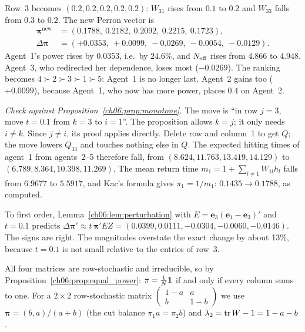 \documentclass[../solutions_manual.tex]{subfiles}
\begin{document}
 Row~3 becomes $(0.2, 0.2, 0.2, 0.2, 0.2)$: $W_{31}$ rises from $0.1$ to $0.2$ and $W_{33}$ falls from $0.3$ to $0.2$. The new Perron vector is
\begin{align*}
\boldsymbol{\pi}^{\text{new}} &= (0.1788,\ 0.2182,\ 0.2092,\ 0.2215,\ 0.1723),\\
\Delta\boldsymbol{\pi} &= (+0.0353,\ +0.0099,\ -0.0269,\ -0.0054,\ -0.0129).
\end{align*}
Agent~1's power rises by $0.0353$, i.e.\ by $24.6\%$, and $N_{\text{eff}}$ rises from $4.866$ to $4.948$. Agent~3, who redirected her dependence, loses most ($-0.0269$). The ranking becomes $4 \succ 2 \succ 3 \succ 1 \succ 5$: Agent~1 is no longer last. Agent~2 gains too ($+0.0099$), because Agent~1, who now has more power, places $0.4$ on Agent~2.

\emph{Check against Proposition~\ref{ch06:prop:monotone}.} The move is ``in row $j = 3$, move $t = 0.1$ from $k = 3$ to $i = 1$''. The proposition allows $k = j$; it only needs $i \ne k$. Since $j \ne i$, its proof applies directly. Delete row and column~1 to get $Q$; the move lowers $Q_{33}$ and touches nothing else in $Q$. The expected hitting times of agent~1 from agents~2--5 therefore fall, from $(8.624, 11.763, 13.419, 14.129)$ to $(6.789, 8.364, 10.398, 11.269)$. The mean return time $m_1 = 1 + \sum_{l\neq 1}W_{1l}h_l$ falls from $6.9677$ to $5.5917$, and Kac's formula gives $\pi_1 = 1/m_1$: $0.1435 \to 0.1788$, as computed.

To first order, Lemma~\ref{ch06:lem:perturbation} with $E = \mathbf{e}_3(\mathbf{e}_1 - \mathbf{e}_3)'$ and $t = 0.1$ predicts $\Delta\boldsymbol{\pi}' \approx t\,\boldsymbol{\pi}'EZ = (0.0399, 0.0111, -0.0304, -0.0060, -0.0146)$. The signs are right. The magnitudes overstate the exact change by about 13\%, because $t = 0.1$ is not small relative to the entries of row~3.


All four matrices are row-stochastic and irreducible, so by Proposition~\ref{ch06:prop:equal_power}: $\pi = \frac1N\mathbf{1}$ if and only if every column sums to one. For a $2\times 2$ row-stochastic matrix $\begin{pmatrix}1-a & a\\ b & 1-b\end{pmatrix}$ we use $\boldsymbol{\pi} = (b, a)/(a+b)$ (the cut balance $\pi_1 a = \pi_2 b$) and $\lambda_2 = \operatorname{tr} W - 1 = 1 - a - b$.
\end{document}
